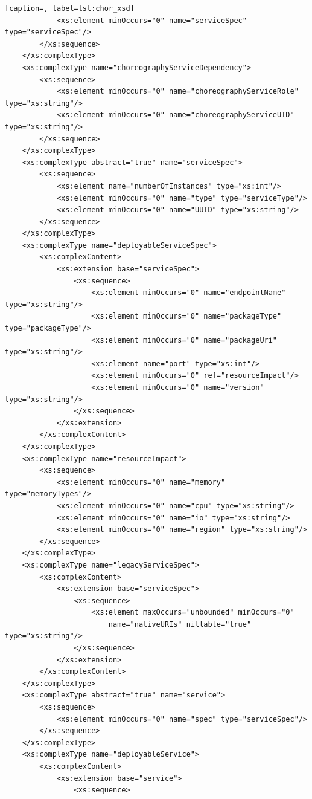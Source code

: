 \documentclass[a4paper, 10pt]{article}
\begin{document}
{\begin{lstlisting}[caption=, label=lst:chor_xsd]
            <xs:element minOccurs="0" name="serviceSpec" type="serviceSpec"/>
        </xs:sequence>
    </xs:complexType>
    <xs:complexType name="choreographyServiceDependency">
        <xs:sequence>
            <xs:element minOccurs="0" name="choreographyServiceRole" type="xs:string"/>
            <xs:element minOccurs="0" name="choreographyServiceUID" type="xs:string"/>
        </xs:sequence>
    </xs:complexType>
    <xs:complexType abstract="true" name="serviceSpec">
        <xs:sequence>
            <xs:element name="numberOfInstances" type="xs:int"/>
            <xs:element minOccurs="0" name="type" type="serviceType"/>
            <xs:element minOccurs="0" name="UUID" type="xs:string"/>
        </xs:sequence>
    </xs:complexType>
    <xs:complexType name="deployableServiceSpec">
        <xs:complexContent>
            <xs:extension base="serviceSpec">
                <xs:sequence>
                    <xs:element minOccurs="0" name="endpointName" type="xs:string"/>
                    <xs:element minOccurs="0" name="packageType" type="packageType"/>
                    <xs:element minOccurs="0" name="packageUri" type="xs:string"/>
                    <xs:element name="port" type="xs:int"/>
                    <xs:element minOccurs="0" ref="resourceImpact"/>
                    <xs:element minOccurs="0" name="version" type="xs:string"/>
                </xs:sequence>
            </xs:extension>
        </xs:complexContent>
    </xs:complexType>
    <xs:complexType name="resourceImpact">
        <xs:sequence>
            <xs:element minOccurs="0" name="memory" type="memoryTypes"/>
            <xs:element minOccurs="0" name="cpu" type="xs:string"/>
            <xs:element minOccurs="0" name="io" type="xs:string"/>
            <xs:element minOccurs="0" name="region" type="xs:string"/>
        </xs:sequence>
    </xs:complexType>
    <xs:complexType name="legacyServiceSpec">
        <xs:complexContent>
            <xs:extension base="serviceSpec">
                <xs:sequence>
                    <xs:element maxOccurs="unbounded" minOccurs="0"
                        name="nativeURIs" nillable="true" type="xs:string"/>
                </xs:sequence>
            </xs:extension>
        </xs:complexContent>
    </xs:complexType>
    <xs:complexType abstract="true" name="service">
        <xs:sequence>
            <xs:element minOccurs="0" name="spec" type="serviceSpec"/>
        </xs:sequence>
    </xs:complexType>
    <xs:complexType name="deployableService">
        <xs:complexContent>
            <xs:extension base="service">
                <xs:sequence>

\end{lstlisting}}
\end{document}
